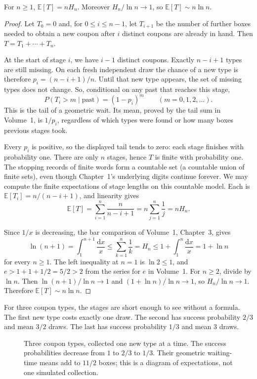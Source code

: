 \begin{theorem}\label{thm:coupon}
For $n\ge1$, $\mathbb E[T]=nH_n$. Moreover $H_n/\ln n\to1$, so $\mathbb E[T]\sim n\ln n$.
\end{theorem}
\begin{proof}
Let $T_0=0$ and, for $0\le i\le n-1$, let $T_{i+1}$ be the number of further boxes needed to obtain a new coupon after $i$ distinct coupons are already in hand. Then $T=T_1+\cdots+T_n$.

At the start of stage $i$, we have $i-1$ distinct coupons. Exactly $n-i+1$ types are still missing. On each fresh independent draw the chance of a new type is therefore $p_i=(n-i+1)/n$. Until that new type appears, the set of missing types does not change. So, conditional on any past that reaches this stage,
\[
 P(T_i>m\mid\text{past})=(1-p_i)^m\qquad(m=0,1,2,\ldots).
\]
This is the tail of a geometric wait. Its mean, proved by the tail sum in Volume~1, is $1/p_i$, regardless of which types were found or how many boxes previous stages took.

Every $p_i$ is positive, so the displayed tail tends to zero: each stage finishes with probability one. There are only $n$ stages, hence $T$ is finite with probability one. The stopping records of finite words form a countable set (a countable union of finite sets), even though Chapter~1's underlying digits continue forever. We may compute the finite expectations of stage lengths on this countable model. Each is $\mathbb E[T_i]=n/(n-i+1)$, and linearity gives
\[
 \mathbb E[T]=\sum_{i=1}^n\frac{n}{n-i+1}=n\sum_{j=1}^n\frac1j=nH_n.
\]

Since $1/x$ is decreasing, the bar comparison of Volume~1, Chapter~3, gives
\[
 \ln(n+1)=\int_1^{n+1}\frac{\mathrm dx}x\le\sum_{k=1}^n\frac1k=H_n\le1+\int_1^n\frac{\mathrm dx}x=1+\ln n
\]
for every $n\ge1$. The left inequality at $n=1$ is $\ln2\le1$, and $e>1+1+1/2=5/2>2$ from the series for $e$ in Volume~1. For $n\ge2$, divide by $\ln n$. Then $\ln(n+1)/\ln n\to1$ and $(1+\ln n)/\ln n\to1$, so $H_n/\ln n\to1$. Therefore $\mathbb E[T]\sim n\ln n$.
\end{proof}


For three coupon types, the stages are short enough to see without a formula. The first new type costs exactly one draw. The second has success probability $2/3$ and mean $3/2$ draws. The last has success probability $1/3$ and mean $3$ draws.

\begin{figure}[ht]
\centering
{}
\caption{Three coupon types, collected one new type at a time. The success probabilities decrease from $1$ to $2/3$ to $1/3$. Their geometric waiting-time means add to $11/2$ boxes; this is a diagram of expectations, not one simulated collection.}
\label{fig:couponstages}
\end{figure}

